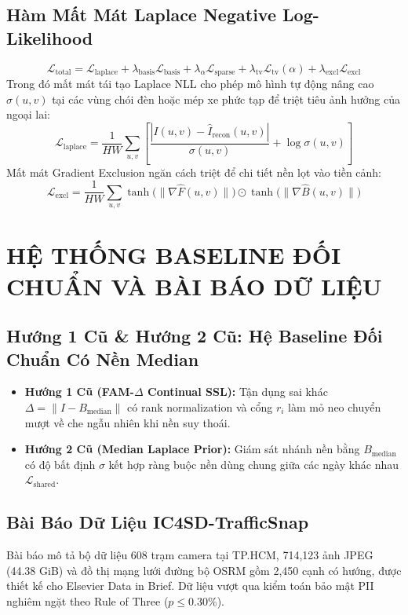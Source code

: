 \documentclass[11pt,a4paper]{article}
\begin{document}
\subsection{Hàm Mất Mát Laplace Negative Log-Likelihood}
\begin{equation}
    \mathcal{L}_{\text{total}} = \mathcal{L}_{\text{laplace}} + \lambda_{\text{basis}} \mathcal{L}_{\text{basis}} + \lambda_{\alpha} \mathcal{L}_{\text{sparse}} + \lambda_{\text{tv}} \mathcal{L}_{\text{tv}}(\alpha) + \lambda_{\text{excl}} \mathcal{L}_{\text{excl}}
\end{equation}
Trong đó mất mát tái tạo Laplace NLL cho phép mô hình tự động nâng cao $\sigma(u, v)$ tại các vùng chói đèn hoặc mép xe phức tạp để triệt tiêu ảnh hưởng của ngoại lai:
\begin{equation}
    \mathcal{L}_{\text{laplace}} = \frac{1}{HW} \sum_{u, v} \left[ \frac{|I(u, v) - \hat{I}_{\text{recon}}(u, v)|}{\sigma(u, v)} + \log \sigma(u, v) \right]
\end{equation}
Mất mát Gradient Exclusion ngăn cách triệt để chi tiết nền lọt vào tiền cảnh:
\begin{equation}
    \mathcal{L}_{\text{excl}} = \frac{1}{HW} \sum_{u, v} \tanh\big(\|\nabla \hat{F}(u, v)\|\big) \odot \tanh\big(\|\nabla \hat{B}(u, v)\|\big)
\end{equation}

\section{HỆ THỐNG BASELINE ĐỐI CHUẨN VÀ BÀI BÁO DỮ LIỆU}

\subsection{Hướng 1 Cũ \& Hướng 2 Cũ: Hệ Baseline Đối Chuẩn Có Nền Median}
\begin{itemize}
    \item \textbf{Hướng 1 Cũ (FAM-$\Delta$ Continual SSL):} Tận dụng sai khác $\Delta = \|I - B_{\text{median}}\|$ có rank normalization và cổng $r_i$ làm mỏ neo chuyển mượt về che ngẫu nhiên khi nền suy thoái.
    \item \textbf{Hướng 2 Cũ (Median Laplace Prior):} Giám sát nhánh nền bằng $B_{\text{median}}$ có độ bất định $\sigma$ kết hợp ràng buộc nền dùng chung giữa các ngày khác nhau $\mathcal{L}_{\text{shared}}$.
\end{itemize}

\subsection{Bài Báo Dữ Liệu IC4SD-TrafficSnap}
Bài báo mô tả bộ dữ liệu 608 trạm camera tại TP.HCM, 714,123 ảnh JPEG (44.38 GiB) và đồ thị mạng lưới đường bộ OSRM gồm 2,450 cạnh có hướng, được thiết kế cho Elsevier Data in Brief. Dữ liệu vượt qua kiểm toán bảo mật PII nghiêm ngặt theo Rule of Three ($p \le 0.30\%$).
\end{document}

